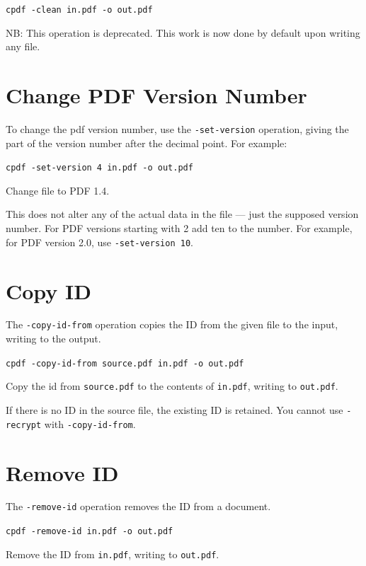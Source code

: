 \documentclass{book}
\begin{document}
  \begin{framed}
  \small\noindent\verb!cpdf -clean in.pdf -o out.pdf!
  \end{framed}

\noindent NB: This operation is deprecated. This work is now done by default upon writing any file.

   \section{Change PDF Version Number}
   \label{setversion}
   To change the pdf version number, use the \texttt{-set-version} operation,
giving the part of the version number after the decimal point. For example:
  \begin{framed}
  \small\noindent\verb!cpdf -set-version 4 in.pdf -o out.pdf!

  \vspace{2.5mm}
  \noindent Change file to PDF 1.4.
  \end{framed} 
  \noindent This does not alter any of the actual data in the file ---
just the supposed version number. For PDF versions starting with 2 add ten to the number. For example, for PDF version 2.0, use \texttt{-set-version 10}.

  \section{Copy ID}
  The \texttt{-copy-id-from} operation copies the ID from the given file to the
input, writing to the output.
  \begin{framed}
  \small\noindent\verb!cpdf -copy-id-from source.pdf in.pdf -o out.pdf!

  \vspace{2.5mm}
  \noindent Copy the id from \texttt{source.pdf} to the contents of \texttt{in.pdf}, writing to \texttt{out.pdf}.
  \end{framed}
  \noindent If there is no ID in the source file, the existing ID is retained. You cannot use \texttt{-recrypt} with \texttt{-copy-id-from}.

\section{Remove ID}
  The \texttt{-remove-id} operation removes the ID from a document.
  \begin{framed}
  \small\noindent\verb!cpdf -remove-id in.pdf -o out.pdf!

  \vspace{2.5mm}
  \noindent Remove the ID from \texttt{in.pdf}, writing to \texttt{out.pdf}.
  \end{framed}
\end{document}
